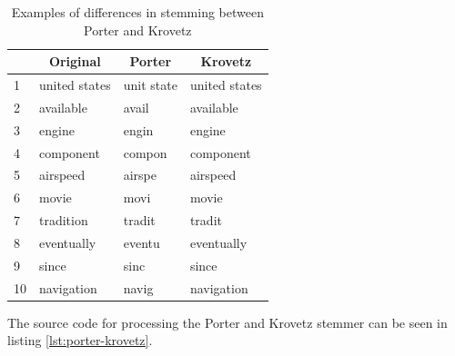 \documentclass[letterpaper,11pt]{article}
\begin{document}
\begin{table}[H]
\centering
\begin{tabular}{|l|l|l|l|}
\hline
\rowcolor[HTML]{ECF4FF} 
\multicolumn{1}{|c|}{\cellcolor[HTML]{ECF4FF}\textbf{No}} & \multicolumn{1}{c|}{\cellcolor[HTML]{ECF4FF}\textbf{Original}} & \multicolumn{1}{c|}{\cellcolor[HTML]{ECF4FF}\textbf{Porter}} & \multicolumn{1}{c|}{\cellcolor[HTML]{ECF4FF}\textbf{Krovetz}} \\ \hline
1 & united states & unit state & united states \\ \hline
2 & available & avail & available \\ \hline
3 & engine & engin & engine \\ \hline
4 & component & compon & component \\ \hline
5 & airspeed & airspe & airspeed \\ \hline
6 & movie & movi & movie \\ \hline
7 & tradition & tradit & tradit \\ \hline
8 & eventually & eventu & eventually \\ \hline
9 & since & sinc & since \\ \hline
10 & navigation & navig & navigation \\ \hline
\end{tabular}
\caption{Examples of differences in stemming between Porter and Krovetz}
\label{tab:porter-krovetz}
\end{table}

The source code for processing the Porter and Krovetz stemmer can be seen in listing \ref{lst:porter-krovetz}.
\end{document}
